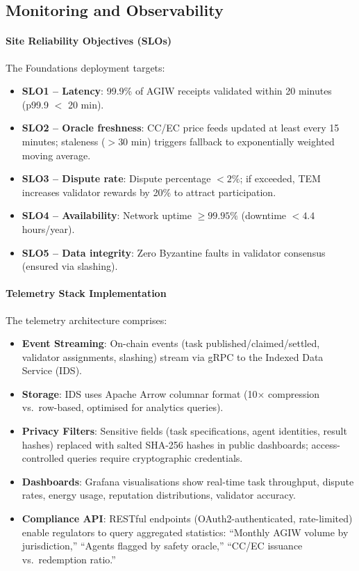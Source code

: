 \documentclass[11pt]{article}
\begin{document}
\subsection{Monitoring and Observability}
\paragraph{Site Reliability Objectives (SLOs)} The Foundations deployment targets:
\begin{itemize}[noitemsep]
  \item \textbf{SLO1 -- Latency}: 99.9\% of AGIW receipts validated within 20 minutes (p99.9 $<$ 20 min).
  \item \textbf{SLO2 -- Oracle freshness}: CC/EC price feeds updated at least every 15 minutes; staleness ($>30$ min) triggers fallback to exponentially weighted moving average.
  \item \textbf{SLO3 -- Dispute rate}: Dispute percentage $<2\%$; if exceeded, TEM increases validator rewards by 20\% to attract participation.
  \item \textbf{SLO4 -- Availability}: Network uptime $\geq 99.95\%$ (downtime $<4.4$ hours/year).
  \item \textbf{SLO5 -- Data integrity}: Zero Byzantine faults in validator consensus (ensured via slashing).
\end{itemize}

\paragraph{Telemetry Stack Implementation} The telemetry architecture comprises:
\begin{itemize}[noitemsep]
  \item \textbf{Event Streaming}: On-chain events (task published/claimed/settled, validator assignments, slashing) stream via gRPC to the Indexed Data Service (IDS).
  \item \textbf{Storage}: IDS uses Apache Arrow columnar format (10$\times$ compression vs.\ row-based, optimised for analytics queries).
  \item \textbf{Privacy Filters}: Sensitive fields (task specifications, agent identities, result hashes) replaced with salted SHA-256 hashes in public dashboards; access-controlled queries require cryptographic credentials.
  \item \textbf{Dashboards}: Grafana visualisations show real-time task throughput, dispute rates, energy usage, reputation distributions, validator accuracy.
  \item \textbf{Compliance API}: RESTful endpoints (OAuth2-authenticated, rate-limited) enable regulators to query aggregated statistics: ``Monthly AGIW volume by jurisdiction,'' ``Agents flagged by safety oracle,'' ``CC/EC issuance vs.\ redemption ratio.''
\end{itemize}
\end{document}
